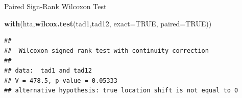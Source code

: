 \documentclass[
  ignorenonframetext,
]{beamer}
\newenvironment{Shaded}{\begin{snugshade}}{\end{snugshade}}
\newcommand{\DataTypeTok}[1]{\textcolor[rgb]{0.13,0.29,0.53}{#1}}
\newcommand{\KeywordTok}[1]{\textcolor[rgb]{0.13,0.29,0.53}{\textbf{#1}}}
\newcommand{\NormalTok}[1]{#1}
\newcommand{\OtherTok}[1]{\textcolor[rgb]{0.56,0.35,0.01}{#1}}
\begin{document}
\begin{frame}[fragile]{Paired Sign-Rank Wilcoxon Test}
\protect\hypertarget{paired-sign-rank-wilcoxon-test}{}

\small

\begin{Shaded}
\begin{Highlighting}[]
\KeywordTok{with}\NormalTok{(hta,}\KeywordTok{wilcox.test}\NormalTok{(tad1,tad12,}
     \DataTypeTok{exact=}\OtherTok{TRUE}\NormalTok{, }\DataTypeTok{paired=}\OtherTok{TRUE}\NormalTok{))}
\end{Highlighting}
\end{Shaded}

\begin{verbatim}
## 
##  Wilcoxon signed rank test with continuity correction
## 
## data:  tad1 and tad12
## V = 478.5, p-value = 0.05333
## alternative hypothesis: true location shift is not equal to 0
\end{verbatim}

\end{frame}
\end{document}
